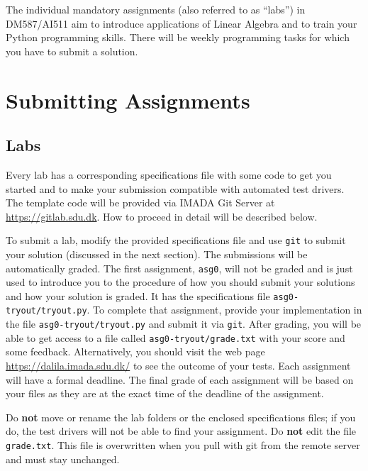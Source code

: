 
The individual mandatory assignments (also referred to as ``labs'') in DM587/AI511 aim to introduce applications of Linear Algebra and to train your Python programming skills. There will be weekly programming tasks for which you have to submit a solution.

\section*{Submitting Assignments} %

\subsection*{Labs}

Every lab has a corresponding specifications file with some code to get you started and to make your submission compatible with automated test drivers. The template code will be provided via IMADA Git Server at \url{https://gitlab.sdu.dk}. 
How to proceed in detail will be described below.


To submit a lab, modify the provided specifications file and use \texttt{git} to submit your solution (discussed in the next section).
The submissions will be automatically graded. 
The first assignment, \texttt{asg0}, will not be graded and is just used to introduce you to the procedure of how you should submit your solutions and how your solution is graded. It has the specifications file \texttt{asg0-tryout/tryout.py}.
To complete that assignment, provide your implementation in the file \texttt{asg0-tryout/tryout.py} and submit it via \texttt{git}.
After grading, you will be able to get access to a file called \texttt{asg0-tryout/grade.txt} with your score and some feedback. Alternatively, you should visit the web page \url{https://dalila.imada.sdu.dk/} to see the outcome of your tests. Each assignment will have a formal deadline. 
The final grade of each assignment will be based on your files as they are at the exact time of the deadline of the assignment.


\begin{warn}
Do \textbf{not} move or rename the lab folders or the enclosed
specifications files; if you do, the test drivers will not be able to
find your assignment. Do \textbf{not} edit the file
\texttt{grade.txt}. This file is overwritten when you pull with git from
the remote server and must stay unchanged. 
\end{warn}


